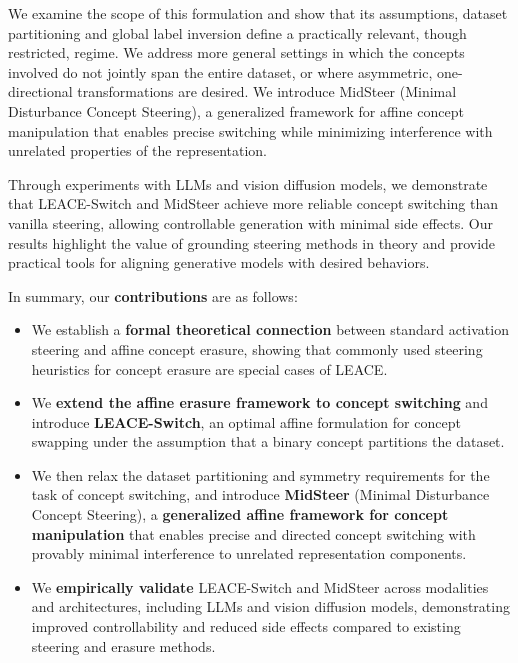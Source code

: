 \documentclass{article}
\theoremstyle{plain}
\theoremstyle{definition}
\theoremstyle{remark}
\begin{document}
We examine the scope of this formulation and show that its assumptions, dataset partitioning and global label inversion define a practically relevant, though restricted, regime. We address more general settings in which the concepts involved do not jointly span the entire dataset, or where asymmetric, one-directional transformations are desired. We introduce MidSteer (Minimal Disturbance Concept Steering), a generalized framework for affine concept manipulation that enables precise switching while minimizing interference with unrelated properties of the representation.

Through experiments with LLMs and vision diffusion models, we demonstrate that LEACE-Switch and MidSteer achieve more reliable concept switching than vanilla steering, allowing controllable generation with minimal side effects. Our results highlight the value of grounding steering methods in theory and provide practical tools for aligning generative models with desired behaviors.

In summary, our \textbf{contributions} are as follows:
\begin{itemize}
    \item We establish a \textbf{formal theoretical connection} between standard activation steering and affine concept erasure, showing that commonly used steering heuristics for concept erasure are special cases of LEACE.
    
    \item We \textbf{extend the affine erasure framework to concept switching} and introduce \textbf{LEACE-Switch}, an optimal affine formulation for concept swapping under the assumption that a binary concept partitions the dataset.
    
    
    \item We then relax the dataset partitioning and symmetry requirements for the task of concept switching, and introduce \textbf{MidSteer} (Minimal Disturbance Concept Steering), a \textbf{generalized affine framework for concept manipulation} that enables precise and directed concept switching with provably minimal interference to unrelated representation components.
    
    \item We \textbf{empirically validate} LEACE-Switch and MidSteer across modalities and architectures, including LLMs and vision diffusion models, demonstrating improved controllability and reduced side effects compared to existing steering and erasure methods.
\end{itemize}
\end{document}
